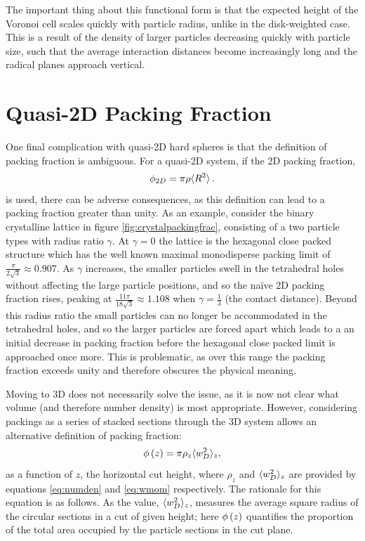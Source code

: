 The important thing about this functional form is that the expected height of the Voronoi cell scales quickly with particle radius, unlike in the disk\--weighted case.
This is a result of the density of larger particles decreasing quickly with particle size, such that the average interaction distances become increasingly long and the radical planes approach vertical.

\section{Quasi\--2D Packing Fraction}
\label{s:qtdpackingfrac}

One final complication with quasi\--2D hard spheres is that the definition of packing fraction is ambiguous.
For a quasi\--2D system, if the 2D packing fraction,
\begin{equation}
	\label{eq:simplepackingfrac}
	\phi_{2D}=\pi\rho\langle R^2\rangle\,.
\end{equation}
is used, there can be adverse consequences, as this definition can lead to a packing fraction greater than unity.
As an example, consider the binary crystalline lattice in figure \ref{fig:crystalpackingfrac}, consisting of a two particle types with radius ratio $\gamma$.
At $\gamma=0$ the lattice is the hexagonal close packed structure which has the well known maximal monodisperse packing limit of $\frac{\pi}{2\sqrt{3}}\approx0.907$.
As $\gamma$ increases, the smaller particles swell in the tetrahedral holes without affecting the large particle positions, and so the na\"ive 2D packing fraction rises, peaking at $\frac{11\pi}{18\sqrt{3}}\approx1.108$ when $\gamma=\frac{1}{3}$ (the contact distance).
Beyond this radius ratio the small particles can no longer be accommodated in the tetrahedral holes, and so the larger particles are forced apart which leads to a an initial decrease in packing fraction before the hexagonal close packed limit is approached once more.
This is problematic, as over this range the packing fraction exceeds unity and therefore obscures the physical meaning.

Moving to 3D does not necessarily solve the issue, as it is now not clear what volume (and therefore number density) is most appropriate.
However, considering \qtd{} packings as a series of stacked sections through the 3D system allows an alternative definition of packing fraction:
\begin{equation}
	\label{eq:altpackingfrac}
	\phi\left(z\right) = \pi\rho_z\langle w_D^2 \rangle_z,
\end{equation}
as a function of $z$, the horizontal cut height, where $\rho_z$ and $\langle w_D^2 \rangle_z$ are provided by equations \eqref{eq:numden} and \eqref{eq:wmom} respectively.
The rationale for this equation is as follows. 
As the value, $\langle w_D^2 \rangle_z$, measures the average square radius of the circular sections in a cut of given height; here $\phi\left(z\right)$ quantifies the proportion of the total area occupied by the particle sections in the cut plane.

